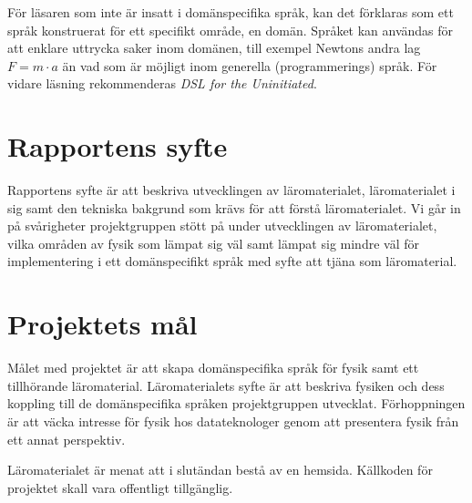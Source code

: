 För läsaren som inte är insatt i domänspecifika språk, kan det
förklaras som ett språk konstruerat för ett specifikt område, en
domän. Språket kan användas för att enklare uttrycka saker inom
domänen, till exempel Newtons andra lag $F=m \cdot a$ än vad som är
möjligt inom generella (programmerings) språk. För vidare läsning
rekommenderas \textit{DSL for the Uninitiated}.\cite{DSLU}

\section{Rapportens syfte}

\begin{draft}
Rapportens syfte är att beskriva utvecklingen av läromaterialet, läromaterialet
i sig samt den tekniska bakgrund som krävs för att förstå läromaterialet. Vi går in på
svårigheter projektgruppen stött på under utvecklingen av läromaterialet, vilka områden
av fysik som lämpat sig väl samt lämpat sig mindre väl för implementering i ett 
domänspecifikt språk med syfte att tjäna som läromaterial.

\end{draft}


\section{Projektets mål}

\begin{draft}

\iffalse
Projekets mål är att skapa ett roligt läromaterial som kombinerar fysik med
tillhörande domänspecika språk. Läromaterialets syfte är att väcka intresse hos läsaren
för fysikaliska samband samt inspirera till vidare studier. DSL:erna är menade att modellera specifikt utvalda
områden inom fysik. Den tillhörande brödtexten är menad att beskriva både DSL:erna, fysiken i sig,    %
samt kopplingen mellan dem.
\fi
Målet med projektet är att skapa domänspecifika språk för fysik samt ett   %
tillhörande läromaterial. Läromaterialets syfte är att beskriva fysiken och  %
dess koppling till de domänspecifika språken projektgruppen utvecklat. Förhoppningen är att väcka intresse
för fysik hos datateknologer genom att presentera fysik från ett annat
perspektiv.

Läromaterialet är menat att i slutändan bestå av en hemsida. Källkoden för projektet
skall vara offentligt tillgänglig.

\end{draft}

